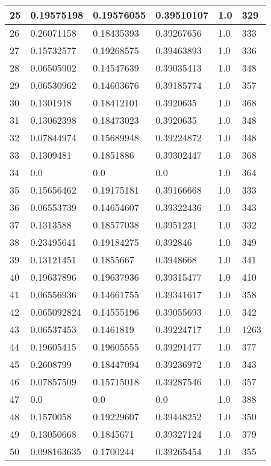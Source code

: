 \begin{longtable}{|l|l|l|l|l|l|}
25 & 0.19575198 & 0.19576055 & 0.39510107 & 1.0 & 329 \\ \hline 
26 & 0.26071158 & 0.18435393 & 0.39267656 & 1.0 & 333 \\ \hline 
27 & 0.15732577 & 0.19268575 & 0.39463893 & 1.0 & 336 \\ \hline 
28 & 0.06505902 & 0.14547639 & 0.39035413 & 1.0 & 348 \\ \hline 
29 & 0.06530962 & 0.14603676 & 0.39185774 & 1.0 & 357 \\ \hline 
30 & 0.1301918 & 0.18412101 & 0.3920635 & 1.0 & 368 \\ \hline 
31 & 0.13062398 & 0.18473023 & 0.3920635 & 1.0 & 348 \\ \hline 
32 & 0.07844974 & 0.15689948 & 0.39224872 & 1.0 & 348 \\ \hline 
33 & 0.1309481 & 0.1851886 & 0.39302447 & 1.0 & 368 \\ \hline 
34 & 0.0 & 0.0 & 0.0 & 1.0 & 364 \\ \hline 
35 & 0.15656462 & 0.19175181 & 0.39166668 & 1.0 & 333 \\ \hline 
36 & 0.06553739 & 0.14654607 & 0.39322436 & 1.0 & 343 \\ \hline 
37 & 0.1313588 & 0.18577038 & 0.3951231 & 1.0 & 332 \\ \hline 
38 & 0.23495641 & 0.19184275 & 0.392846 & 1.0 & 349 \\ \hline 
39 & 0.13121451 & 0.1855667 & 0.3948668 & 1.0 & 341 \\ \hline 
40 & 0.19637896 & 0.19637936 & 0.39315477 & 1.0 & 410 \\ \hline 
41 & 0.06556936 & 0.14661755 & 0.39341617 & 1.0 & 358 \\ \hline 
42 & 0.065092824 & 0.14555196 & 0.39055693 & 1.0 & 342 \\ \hline 
43 & 0.06537453 & 0.1461819 & 0.39224717 & 1.0 & 1263 \\ \hline 
44 & 0.19605415 & 0.19605555 & 0.39291477 & 1.0 & 377 \\ \hline 
45 & 0.2608799 & 0.18447094 & 0.39236972 & 1.0 & 343 \\ \hline 
46 & 0.07857509 & 0.15715018 & 0.39287546 & 1.0 & 357 \\ \hline 
47 & 0.0 & 0.0 & 0.0 & 1.0 & 388 \\ \hline 
48 & 0.1570058 & 0.19229607 & 0.39448252 & 1.0 & 350 \\ \hline 
49 & 0.13050668 & 0.1845671 & 0.39327124 & 1.0 & 379 \\ \hline 
50 & 0.098163635 & 0.1700244 & 0.39265454 & 1.0 & 355 \\ \hline 
\end{longtable}